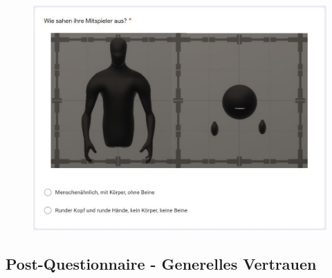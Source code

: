 \documentclass[a4paper,11pt]{article}%
\renewcommand{\\}{\vspace*{0.5\baselineskip} \newline}
\begin{document}
{{	\begin{figure}[H]
	\centering
		\begin{footnotesize}
			\includegraphics[scale=0.6]{Abbildungen/Fragebogen/Post-Questionnaire/PQM1}
		\end{footnotesize}
	\end{figure}	

\newpage

\subsection{Post-Questionnaire - Generelles Vertrauen}
\label{Post-Questionnaire - Generelles Vertrauen}

}}
\end{document}
